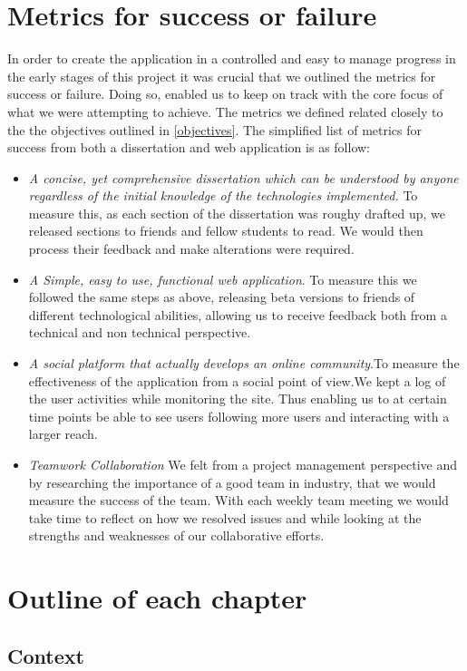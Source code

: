 \section{Metrics for success or failure} \label{metrics}
In order to create the application in a controlled and easy to manage progress in the early stages of this project it was crucial that we outlined the metrics for success or failure. Doing so, enabled us to keep on track with the core focus of what we were attempting to achieve. The metrics we defined related closely to the the objectives outlined in \ref{objectives}. The simplified list of metrics for success from both a dissertation and web application is as follow:
\begin{itemize}
  \item \textit{A concise, yet comprehensive dissertation which can be understood by anyone regardless of the initial knowledge of the technologies implemented.} To measure this, as each section of the dissertation was roughy drafted up, we released sections to friends and fellow students to read. We would then process their feedback and make alterations were required.  
  \item \textit{A Simple, easy to use, functional web application}. To measure this we followed the same steps as above, releasing beta versions to friends of different technological abilities, allowing us to receive feedback both from a technical and non technical perspective.
  \item \textit{A social platform that actually develops an online community}.To measure the effectiveness of the application from a social point of view.We kept a log of the user activities while monitoring the site. Thus enabling us to at certain time points be able to see users following more users and interacting with a larger reach.
  \item \textit{Teamwork Collaboration} We felt from a project management perspective and by researching the importance of a good team in industry, that we would measure the success of the team. With each weekly team meeting we would take time to reflect on how we resolved issues and while looking at the strengths and weaknesses of our collaborative efforts. 
\end{itemize}


\section{Outline of each chapter}

\subsection{Context}
